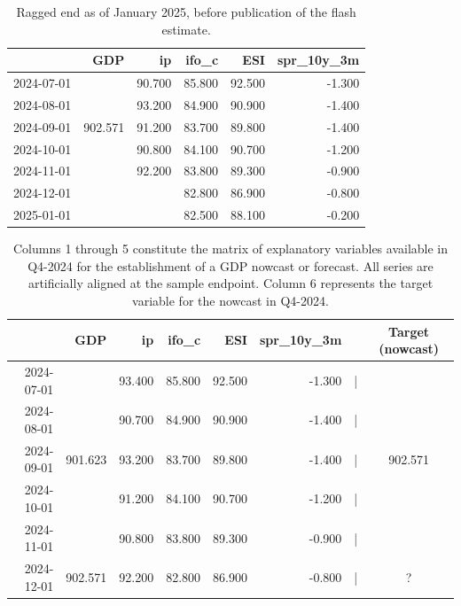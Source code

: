 \documentclass[11pt,a4paper]{article}
\begin{document}
\begin{table}[ht]
\centering
\begin{tabular}{rrrrrr}
  \hline
 & GDP & ip & ifo\_c & ESI & spr\_10y\_3m \\ 
  \hline
2024-07-01 &  & 90.700 & 85.800 & 92.500 & -1.300 \\ 
  2024-08-01 &  & 93.200 & 84.900 & 90.900 & -1.400 \\ 
  2024-09-01 &902.571  & 91.200 & 83.700 & 89.800 & -1.400 \\ 
  2024-10-01 &  & 90.800 & 84.100 & 90.700 & -1.200 \\ 
  2024-11-01 &  & 92.200 & 83.800 & 89.300 & -0.900 \\ 
  2024-12-01 &  &  & 82.800 & 86.900 & -0.800 \\ 
  2025-01-01 &  &  & 82.500 & 88.100 & -0.200 \\ 
   \hline
\end{tabular}
\caption{Ragged end as of January 2025, before publication of the flash estimate.} 
\label{tab:data_stucture}
\end{table}










\begin{table}[ht]
\centering
\begin{tabular}{rrrrrrrc}
  \hline
 & GDP & ip & ifo\_c & ESI & spr\_10y\_3m &&Target (nowcast)\\ 
  \hline
  2024-07-01 & & 93.400 & 85.800 & 92.500 & -1.300&|& \\ 
  2024-08-01 & & 90.700&  84.900 & 90.900 & -1.400&| &\\ 
  2024-09-01 & 901.623 &93.200 & 83.700 & 89.800 & -1.400&| &902.571\\ 
  2024-10-01 &  &91.200 & 84.100 & 90.700 & -1.200&| &\\ 
  2024-11-01 &  & 90.800& 83.800 & 89.300 & -0.900&| &\\ 
  2024-12-01 &902.571   & 92.200  & 82.800 & 86.900 & -0.800&| &?\\ 
    \hline
\end{tabular}
\caption{Columns 1 through 5 constitute the matrix of explanatory variables available in Q4-2024 for the establishment of a GDP nowcast or forecast. All series are artificially aligned at the sample endpoint. Column 6 represents the target variable for the nowcast in Q4-2024.} 
\label{tab:data_stucture_aligned}
\end{table}
\end{document}
